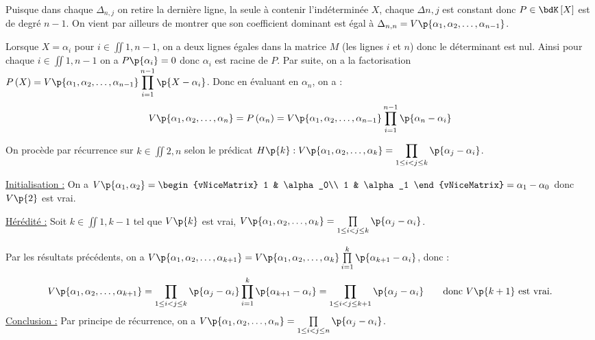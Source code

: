 \documentclass[a4paper,french,bookmarks]{article}
\begin{document}
\begin{enumerate}
\begin{nproof}
\begin{enumerate}
                \itt Puisque dans chaque $\Delta_{n, j}$ on retire la dernière ligne, la seule à contenir l'indéterminée $X$, chaque $\Delta{n, j}$ est constant donc $P \in \bdK\left[X\right]$ est de degré $n-1$. On vient par ailleurs de montrer que son coefficient dominant est égal à $\Delta_{n, n} = V\p{\alpha_1, \alpha_2, \dots, \alpha_{n-1}}$.
                
                \itt Lorsque $X = \alpha_i$ pour $i \in \iint{1, n-1}$, on a deux lignes égales dans la matrice $M$ (les lignes $i$ et $n$) donc le déterminant est nul. Ainsi pour chaque $i \in \iint{1, n-1}$ on a $P\p{\alpha_i} = 0$ donc $\alpha_i$ est racine de $P$. Par suite, on a la factorisation $\displaystyle P\left(X\right) = V\p{\alpha_1, \alpha_2, \dots, \alpha_{n-1}}\prod_{i = 1}^{n-1}\p{X - \alpha_i}$. Donc en évaluant en $\alpha_n$, on a :
                \[V\p{\alpha_1, \alpha_2, \dots, \alpha_n} = P\left(\alpha_n\right) = V\p{\alpha_1, \alpha_2, \dots, \alpha_{n-1}}\prod_{i=1}^{n-1} \p{\alpha_n - \alpha_i}\]
                
                \itt On procède par récurrence sur $k \in \iint{2, n}$ selon le prédicat $H\p{k} : V\p{\alpha_1, \alpha_2, \dots, \alpha_k} = \displaystyle \prod_{1 \leq i < j \leq k} \p{\alpha_j - \alpha_i}$.
                
                \itstar \underline{Initialisation :} On a $V\p{\alpha_1, \alpha_2} = \begin{vNiceMatrix}
                    1 & \alpha_0\\
                    1 & \alpha_1
                \end{vNiceMatrix} = \alpha_1 - \alpha_0$ donc $V\p{2}$ est vrai.
                
                \itstar \underline{Hérédité :} Soit $k \in \iint{1, k-1}$ tel que $V\p{k}$ est vrai, \ie $ V\p{\alpha_1, \alpha_2, \dots, \alpha_k} = \prod\limits_{1 \leq i < j \leq k} \p{\alpha_j - \alpha_i}$.
                
                Par les résultats précédents, on a $ V\p{\alpha_1, \alpha_2, \dots, \alpha_{k+1}} = V\p{\alpha_1, \alpha_2, \dots, \alpha_k}\prod\limits_{i=1}^{k} \p{\alpha_{k+1} - \alpha_i}$, donc :
                \[ V\p{\alpha_1, \alpha_2, \dots, \alpha_{k+1}} = \prod_{1 \leq i < j \leq k} \p{\alpha_j - \alpha_i}\prod_{i=1}^{k} \p{\alpha_{k+1} - \alpha_i} = \prod_{1 \leq i < j \leq k+1} \p{\alpha_j - \alpha_i} \qquad\text{donc} \ V\p{k+1} \ \text{est vrai.}\]
                \itstar \underline{Conclusion :} Par principe de récurrence, on a $V\p{\alpha_1, \alpha_2, \dots, \alpha_n} = \prod\limits_{1 \leq i < j \leq n} \p{\alpha_j - \alpha_i}$.
            \end{enumerate}
            

\end{nproof}
\end{enumerate}
\end{document}
